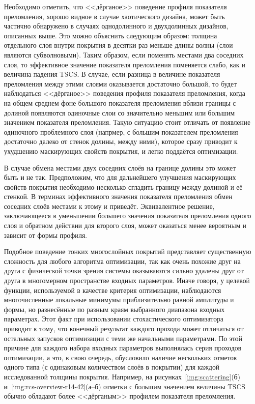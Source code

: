 Необходимо отметить, что <<дёрганое>> поведение профиля показателя
преломления, хорошо видное в случае хаотического дизайна, может быть
частично обнаружено в случаях однодолинного и двухдолинных дизайнов,
описанных выше.  Это можно объяснить следующим образом: толщина
отдельного слоя внутри покрытия в десятки раз меньше длины волны (слои
являются субволновыми).  Таким образом, если поменять местами два
соседних слоя, то эффективное значение показателя преломления
поменяется слабо, как и величина падения TSCS.  В случае, если разница
в величине показателя преломления между этими слоями оказывается
достаточно большой, то будет наблюдаться <<дёрганое>> поведения
профиля показателя преломления, когда на общем среднем фоне большого
показателя преломления вблизи границы с долиной появляются одиночные
слои со значительно меньшим или большим значением показателя
преломления. Такую ситуацию стоит отличать от появление одиночного
проблемного слоя (напрмер, с большим показателем преломления
достаточно далеко от стенок долины, между ними), которое сразу приводит к
ухудшению маскирующих свойств покрытия, и легко поддаётся оптимизации.

В случае обмена местами двух соседних слоёв на границе долины это
может быть и не так. Предположим, что для дальнейшего улучшения
маскирующих свойств покрытия необходимо несколько сгладить границу
между долиной и её стенкой. В терминах эффективного значения
показателя преломления обмен соседних слоёв местами к этому и
приведёт. Эквивалентное решение, заключающееся в уменьшении большего
значения показателя преломления одного слоя и обратном действии для
второго слоя, может оказаться менее вероятным и зависит от формы
профиля.

Подобное поведение тонких многослойных покрытий представляет
существенную сложность для любого алгоритма оптимизации, так как очень
похожие друг на друга с физической точки зрения системы оказываются
сильно удалены друг от друга в многомерном пространстве входных
параметров.  Иначе говоря, у целевой функции, используемой в качестве
критерия оптимизации, наблюдаются многочисленные локальные минимумы
приблизительно равной амплитуды и формы, но разнесённые по разным
краям выбранного диапазона входных параметрах.  Этот факт при
использовании стохастического оптимизатора приводит к тому, что
конечный результат каждого прохода может отличаться от остальных
запусков оптимизации с теми же начальными параметрами.  По этой
причине для каждого набора входных параметров выполнялась серия
проходов оптимизации, а это, в свою очередь, обусловило наличие
нескольких отметок одного типа (с одинаковым количеством слоёв в
покрытии) для каждой исследованной толщины покрытия. Например, на
рисунках~\ref{img:scattering}(б) и~\ref{img:rcs-overview-r14-42}(а--б)
отметки с большим значением величины TSCS обычно обладают более
<<дёрганым>> профилем показателя преломления.

